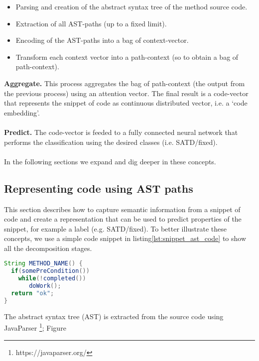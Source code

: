 \begin{itemize}
    \item Parsing and creation of the abstract syntax tree of the method source code. 
    \item Extraction of all AST-paths (up to a fixed limit).
    \item Encoding of the AST-paths into a bag of context-vector.
    \item Transform each context vector into a path-context (so to obtain a bag of path-context).
\end{itemize}

\noindent \textbf{Aggregate.} This process aggregates the bag of path-context (the output from the previous process) using an attention vector. The final result is a code-vector that represents the snippet of code as continuous distributed vector, i.e. a `code embedding'.
\\
\\
\noindent \textbf{Predict.} The code-vector is feeded to a fully connected neural network that performs the classification using the desired classes (i.e. SATD/fixed).
\\
\\
\noindent In the following sections we expand and dig deeper in these concepts.


\subsection{Representing code using AST paths}
This section describes how to capture semantic information from a snippet of code and create a representation that can be used to predict properties of the snippet, for example a label (e.g. SATD/fixed).
To better illustrate these concepts, we use a simple code snippet in listing\ref{lst:snippet_ast_code} to show all the decomposition stages.  


\begin{lstlisting}[caption={Code snippet with 199 tokens}, label={lst:snippet_ast_code},language=Java]
String METHOD_NAME() {
  if(somePreCondition())
    while(!completed())
       doWork();
  return "ok";
}
\end{lstlisting}

The abstract syntax tree (AST) is extracted from the source code using JavaParser \footnote{https://javaparser.org/}; Figure 

